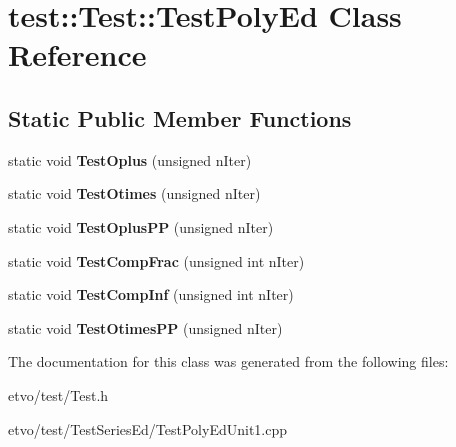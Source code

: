 \hypertarget{classtest_1_1_test_1_1_test_poly_ed}{}\section{test\+:\+:Test\+:\+:Test\+Poly\+Ed Class Reference}
\label{classtest_1_1_test_1_1_test_poly_ed}
\subsection*{Static Public Member Functions}
\begin{DoxyCompactItemize}
\item 
\mbox{\label{classtest_1_1_test_1_1_test_poly_ed_a54a519e928514d6042cb285291b3a76f}} 
static void {\bfseries Test\+Oplus} (unsigned n\+Iter)
\item 
\mbox{\label{classtest_1_1_test_1_1_test_poly_ed_a8b03f6f328e379f9ee02da2cb0557917}} 
static void {\bfseries Test\+Otimes} (unsigned n\+Iter)
\item 
\mbox{\label{classtest_1_1_test_1_1_test_poly_ed_ad4294e8e7c4bae5d2540cd85da62b708}} 
static void {\bfseries Test\+Oplus\+PP} (unsigned n\+Iter)
\item 
\mbox{\label{classtest_1_1_test_1_1_test_poly_ed_aa5d215f4ab4312f6d09893c3f44449a9}} 
static void {\bfseries Test\+Comp\+Frac} (unsigned int n\+Iter)
\item 
\mbox{\label{classtest_1_1_test_1_1_test_poly_ed_a2fd9bff22debe6c038e7001ca82bcbd6}} 
static void {\bfseries Test\+Comp\+Inf} (unsigned int n\+Iter)
\item 
\mbox{\label{classtest_1_1_test_1_1_test_poly_ed_ab4e1fd31cbed2ef4aa8f3bd8e81bb0d0}} 
static void {\bfseries Test\+Otimes\+PP} (unsigned n\+Iter)
\end{DoxyCompactItemize}


The documentation for this class was generated from the following files\+:\begin{DoxyCompactItemize}
\item 
etvo/test/Test.\+h\item 
etvo/test/\+Test\+Series\+Ed/Test\+Poly\+Ed\+Unit1.\+cpp\end{DoxyCompactItemize}
